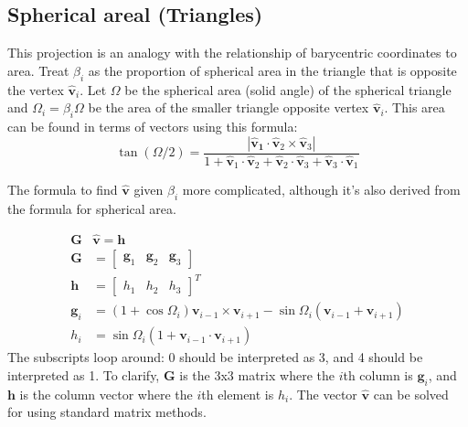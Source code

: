 \documentclass{amsart}[12pt]
\begin{document}
\subsection{Spherical areal (Triangles)}
This projection is an analogy with the relationship of barycentric coordinates
to area. Treat $\beta_i$ as the proportion of spherical area in the triangle
that is opposite the vertex $\hat{\mathbf v}_i$. Let $\Omega$ be the spherical
area (solid angle) of the spherical triangle and $\Omega_i = \beta_i\Omega$ be
the area of the smaller triangle opposite vertex $\hat{\mathbf v}_i$.
This area can be found in terms of vectors using this formula:\cite{oosterom}\cite{eriksson}
\begin{equation}
\tan(\Omega/2) = \frac{|\mathbf{\hat{v}_1} \cdot
       \mathbf{\hat{v}}_2 \times \mathbf{\hat{v}}_3|}
       {1+\mathbf{\hat{v}}_1\cdot \mathbf{\hat{v}}_2+\mathbf{\hat{v}}_2
       \cdot \mathbf{\hat{v}}_3+\mathbf{\hat{v}}_3\cdot \mathbf{\hat{v}}_1}
\end{equation}

The formula to find $\hat{\mathbf v}$ given $\beta_i$ more complicated,
although it's also derived from the formula for spherical area.


\begin{equation}
\label{eq:sphareal}
  \begin{split}
  \mathbf G & \hat{\mathbf v} = \mathbf h \\
   \mathbf G & = \begin{bmatrix}
   \mathbf g_1 & \mathbf g_2 & \mathbf g_3 \end{bmatrix} \\
   \mathbf h & = \begin{bmatrix} h_1  & h_2 & h_3  \end{bmatrix}^T \\
   \mathbf g_{i} & = \left(1+\cos \Omega_{i}\right) \mathbf v_{i-1} \times
   \mathbf v_{i+1} - \sin\Omega_{i}\left(\mathbf v_{i-1} +
   \mathbf v_{i+1}\right)\\
   h_i &= \sin\Omega_i\left(1+\mathbf v_{i-1}\cdot\mathbf v_{i+1}\right)
\end{split}\end{equation}
The subscripts loop around: 0 should be interpreted as 3, and 4 should be
interpreted as 1. To clarify, $\mathbf G$ is the 3x3 matrix where the $i$th
column is $\mathbf g_i$, and $\mathbf h$ is the column vector where the
$i$th element is $h_i$. The vector $\hat{\mathbf v}$
can be solved for using standard matrix methods.
\end{document}
